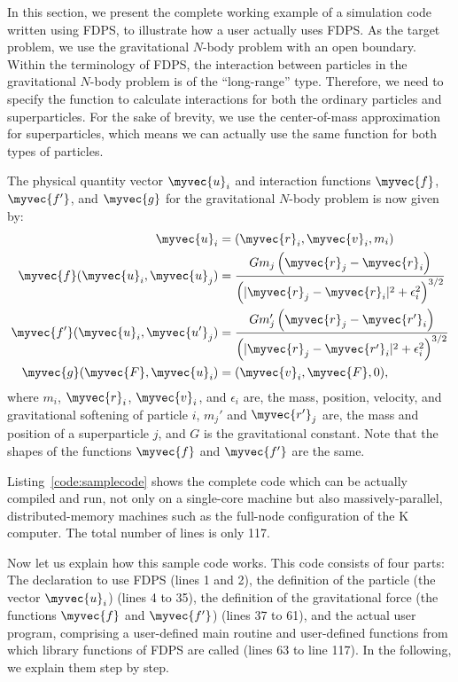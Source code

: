 In this section, we present the complete working example of a
simulation code written using FDPS, to illustrate how a user actually
uses FDPS. As the target problem, we use the gravitational $N$-body
problem with an open boundary.  Within the terminology of FDPS, the
interaction between particles in the gravitational $N$-body problem is
of the ``long-range'' type. Therefore, we need to specify the function
to calculate interactions for both the ordinary particles and
superparticles. For the sake of brevity, we use the center-of-mass
approximation for superparticles, which means we can actually use the
same function for both types of particles.

The physical quantity vector $\myvec{u}_i$ and interaction functions
$\myvec{f}$, $\myvec{f'}$, and $\myvec{g}$ for the gravitational
$N$-body problem is now given by:
\begin{align}
  \myvec{u}_i &= (\myvec{r}_i,
  \myvec{v}_i,m_i) \label{eq:PhysicalVectorNbody} \\
  \myvec{f} (\myvec{u}_i, \myvec{u}_j) &= \frac{Gm_j \left(
    \myvec{r}_j - \myvec{r}_i \right)}{ \left( |\myvec{r}_j -
    \myvec{r}_i|^2 + \epsilon_i^2
    \right)^{3/2}} \label{eq:ParticleParticleNbody} \\
  \myvec{f'} (\myvec{u}_i, \myvec{u'}_j) &= \frac{Gm_j' \left(
    \myvec{r}_j - \myvec{r'}_i \right)}{ \left( |\myvec{r}_j -
    \myvec{r'}_i|^2 + \epsilon_i^2
    \right)^{3/2}} \label{eq:ParticleSuperparticleNbody} \\
  \myvec{g}(\myvec{F},\myvec{u}_i)  &= (\myvec{v}_i,\myvec{F},0),
\label{eq:ConversionNbody}
\end{align}
where $m_i$, $\myvec{r}_i$, $\myvec{v}_i$, and $\epsilon_i$ are, the
mass, position, velocity, and gravitational softening of particle $i$,
$m_j'$ and $\myvec{r'}_j$ are, the mass and position of a
superparticle $j$, and $G$ is the gravitational constant.  Note that
the shapes of the functions $\myvec{f}$ and $\myvec{f'}$ are the same.

Listing~\ref{code:samplecode} shows the complete code which can be
actually compiled and run, not only on a single-core machine but also
massively-parallel, distributed-memory machines such as the full-node
configuration of the K computer. The total number of lines is only
117.



Now let us explain how this sample code works. This code consists of
four parts: The declaration to use FDPS (lines 1 and 2), the
definition of the particle (the vector $\myvec{u}_i$) (lines 4 to 35),
the definition of the gravitational force (the functions $\myvec{f}$
and $\myvec{f'}$) (lines 37 to 61), and the actual user program,
comprising a user-defined main routine and user-defined functions from
which library functions of FDPS are called (lines 63 to line 117). In
the following, we explain them step by step.

